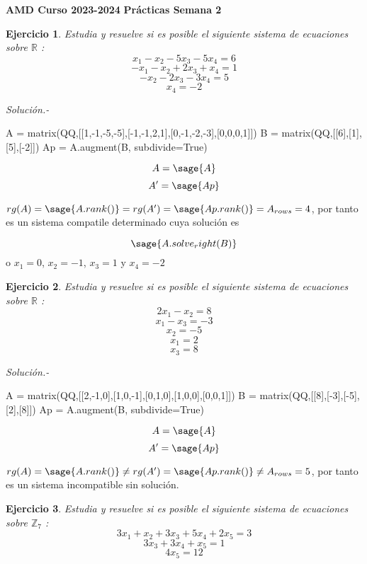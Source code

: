 \documentclass{amsart}
\newtheorem{ejer}{Ejercicio}
\def\r{\mathbb{R}}
\def\z{\mathbb{Z}}
\begin{document}
\begin{center}
\textrm{ \bf {AMD Curso 2023-2024}}
\vskip 0.3cm
\textrm{ \bf {Prácticas Semana 2} }
\end{center}

\begin{ejer} Estudia y resuelve si es posible el siguiente sistema de ecuaciones sobre $\r $ :
\[ x_{1} - x_{2} - 5 x_{3} - 5 x_{4} = 6 \]
\[ -x_{1} - x_{2} + 2 x_{3} + x_{4} = 1 \]
\[ -x_{2} - 2 x_{3} - 3 x_{4} = 5 \]
\[ x_{4} = -2 \]
\end{ejer}

{\it Soluci\'on.-}
\begin{sageblock}
A = matrix(QQ,[[1,-1,-5,-5],[-1,-1,2,1],[0,-1,-2,-3],[0,0,0,1]])
B = matrix(QQ,[[6],[1],[5],[-2]])
Ap = A.augment(B, subdivide=True)
\end{sageblock}

$$
	A = \sage{A}
$$
$$
	A' = \sage{Ap}
$$

$rg(A) = \sage{A.rank()} = rg(A') = \sage{Ap.rank()} = A_{rows} = 4$, por tanto es un sistema compatile determinado cuya solución es

$$
	\sage{A.solve_right(B)}
$$
o $x_1 = 0$, $x_2 = -1$, $x_3 = 1$ y $x_4 = -2$


\begin{ejer} Estudia y resuelve si es posible el siguiente sistema de ecuaciones sobre $\r $ :
\[ 2 x_{1} - x_{2} = 8 \]
\[ x_{1} - x_{3} = -3 \]
\[ x_{2} = -5 \]
\[ x_{1} = 2 \]
\[ x_{3} = 8 \]
\end{ejer}

{\it Soluci\'on.-}
\begin{sageblock}
A = matrix(QQ,[[2,-1,0],[1,0,-1],[0,1,0],[1,0,0],[0,0,1]])
B = matrix(QQ,[[8],[-3],[-5],[2],[8]])
Ap = A.augment(B, subdivide=True)
\end{sageblock}

$$
A = \sage{A}
$$
$$
A' = \sage{Ap}
$$

$rg(A) = \sage{A.rank()} \not= rg(A') = \sage{Ap.rank()} \not= A_{rows} = 5$, por tanto es un sistema incompatible sin solución.




\begin{ejer} Estudia y resuelve si es posible el siguiente sistema de ecuaciones sobre $\z _7$ :
\[ 3x_{1} + x_{2} + 3x_{3} + 5x_{4} + 2x_{5} = 3 \]
\[ 3x_{3} + 3x_{4} + x_{5} = 1 \]
\[ 4x_{5} = 12 \]

\end{ejer}
\end{document}
